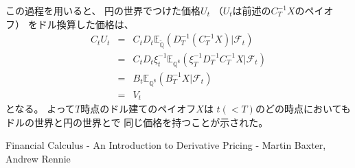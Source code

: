 \documentclass[uplatex,a4j,12pt,dvipdfmx]{jsarticle}
\begin{document}
${}$

この過程を用いると、
円の世界でつけた価格$U_{t}$
（$U_{t}$は前述の$C^{-1}_{T} X$のペイオフ）
をドル換算した価格は、
%
%
\begin{eqnarray*}
	C_{t} U_{t}
	&=&
	C_{t}
	D_{t}
	\mathbb{E}_{\tilde{\mathbb{Q}}}
	( D^{-1}_{T} ( C^{-1}_{T} X ) | \mathcal{F}_{t} )
	\\ &=&
	C_{t} D_{t} \xi^{-1}_{t}
	\mathbb{E}_{\mathbb{Q}^{\$}}
	( \xi^{-1}_{T} D^{-1}_{T}  C^{-1}_{T} X | \mathcal{F}_{t} )
	\\ &=&
	B_{t}
	\mathbb{E}_{\mathbb{Q}^{\$}}
	( B^{-1}_{T} X | \mathcal{F}_{t} )
	\\ &=&
	V_{t}
\end{eqnarray*}
%
%
となる。
よって$T$時点のドル建てのペイオフ$X$は
$t(<T)$のどの時点においても
ドルの世界と円の世界とで
同じ価格を持つことが示された。
\begin{thebibliography}{9}
	Financial Calculus - An Introduction to Derivative Pricing - Martin Baxter, Andrew Rennie
\end{thebibliography}
\end{document}
